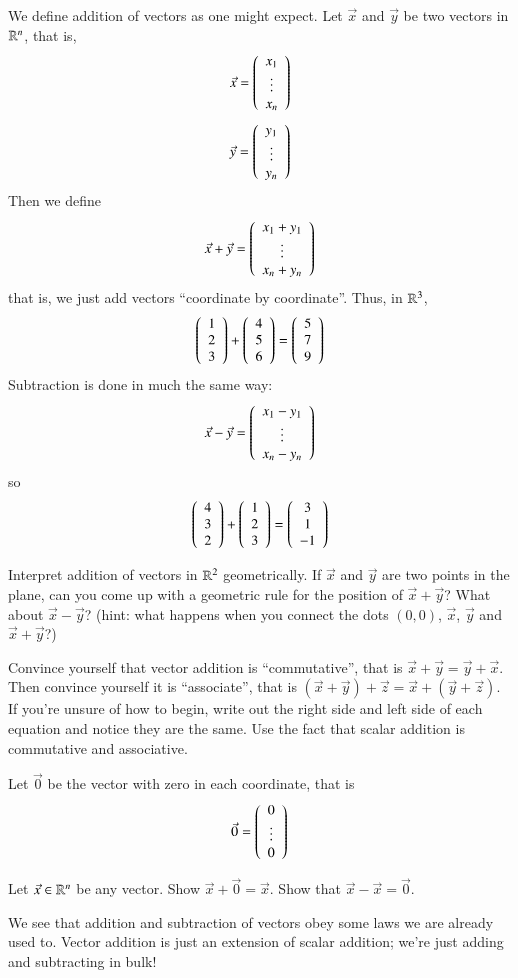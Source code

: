 \documentclass[Main.tex]{subfiles}
\begin{document}
We define addition of vectors as one might expect.
Let $\vec{x}$ and $\vec{y}$ be two vectors in $\mathbb{R}^n$, that is,
\[\vec{x}=\left(\begin{array}{c}x_1 \\ \vdots \\ x_n\end{array}\right)\]
\[\vec{y}=\left(\begin{array}{c}y_1 \\ \vdots \\ y_n\end{array}\right)\]
Then we define
\[\vec{x}+\vec{y}=\left(\begin{array}{c}x_1+y_1 \\ \vdots \\ x_n+y_n\end{array}\right)\]
that is, we just add vectors ``coordinate by coordinate''.
Thus, in $\mathbb{R}^3$, 
\[\left(\begin{array}{c}1 \\ 2 \\ 3\end{array}\right) + \left(\begin{array}{c}4 \\ 5 \\ 6\end{array}\right) = \left(\begin{array}{c}5\\7\\ 9\end{array}\right)\]
Subtraction is done in much the same way:
\[\vec{x}-\vec{y}=\left(\begin{array}{c}x_1-y_1 \\ \vdots \\ x_n-y_n\end{array}\right)\]
so
\[\left(\begin{array}{c}4 \\ 3 \\ 2\end{array}\right) + \left(\begin{array}{c}1 \\ 2 \\ 3\end{array}\right) = \left(\begin{array}{c}3\\1\\-1\end{array}\right)\]
\begin{Ex}
  Interpret addition of vectors in $\mathbb{R}^2$ geometrically.  
  If $\vec{x}$ and $\vec{y}$ are two points in the plane, can you come up with a geometric rule for the position of $\vec{x}+\vec{y}$?
  What about $\vec{x}-\vec{y}$?  
  (hint: what happens when you connect the dots $(0,0)$, $\vec{x}$, $\vec{y}$ and $\vec{x}+\vec{y}$?)
\end{Ex}
\begin{Ex}
  \label{sec:abgroup-laws}

  Convince yourself that vector addition is ``commutative'', that is $\vec{x}+\vec{y}=\vec{y}+\vec{x}$. 
  Then convince yourself it is ``associate'', that is $(\vec{x}+\vec{y})+\vec{z}=\vec{x}+(\vec{y}+\vec{z})$. 
  If you're unsure of how to begin, write out the right side and left side of each equation and notice they are the same.  
  Use the fact that scalar addition is commutative and associative.  
\end{Ex}

Let $\vec{0}$ be the vector with zero in each coordinate, that is 
\[\vec{0}=\left(\begin{array}{c}0 \\ \vdots \\ 0\end{array}\right)\]
\begin{EasyEx}
  Let $\vec{x}\in \mathbb{R}^n$ be any vector.  Show $\vec{x}+\vec{0} = \vec{x}$.  
  Show that $\vec{x}-\vec{x}=\vec{0}$.
\end{EasyEx}
We see that addition and subtraction of vectors obey some laws we are already used to.
Vector addition is just an extension of scalar addition; we're just adding and subtracting in bulk!
\end{document}
